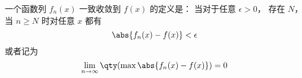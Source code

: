 
一个函数列 $f_n(x)$ 一致收敛到 $f(x)$ 的定义是： 当对于任意 $\epsilon > 0$， 存在 $N$， 当 $n \geqslant N$ 时对任意 $x$ 都有
\begin{equation}
\abs{f_n(x) - f(x)} < \epsilon
\end{equation}
或者记为
\begin{equation}
\lim_{n\to\infty} \qty(\max \abs{f_n(x) - f(x)}) = 0
\end{equation}
